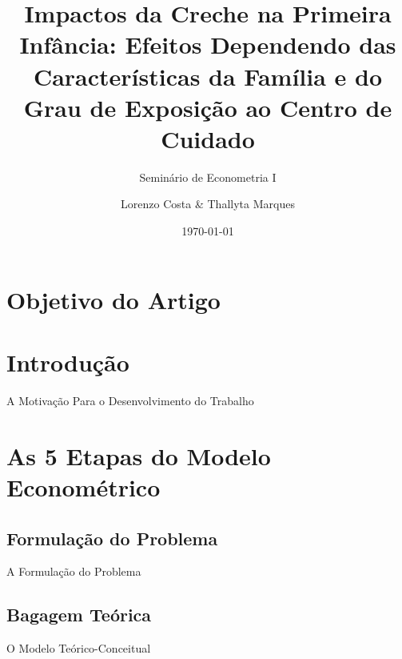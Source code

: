 \documentclass[10pt]{Beamer}
\title{Impactos da Creche na Primeira Infância: Efeitos Dependendo das Características da Família e do Grau de Exposição ao Centro de Cuidado}
\subtitle{Seminário de Econometria I}
\author{Lorenzo Costa \& Thallyta Marques}
\institute{Universidade Federal do Tocantins}
\date{\today}
\begin{document}
	
\frame{\titlepage}
\frame{\tableofcontents}

\section{Objetivo do Artigo}


\section{Introdução}
\begin{frame}{A Motivação Para o Desenvolvimento do Trabalho}
\end{frame}

\section{As 5 Etapas do Modelo Econométrico}
	
	\subsection{Formulação do Problema}
	
\begin{frame}{A Formulação do Problema}
	

	
\end{frame}	


	\subsection{Bagagem Teórica}
	
\begin{frame}{O Modelo Teórico-Conceitual }
	
\end{frame}
\end{document}
